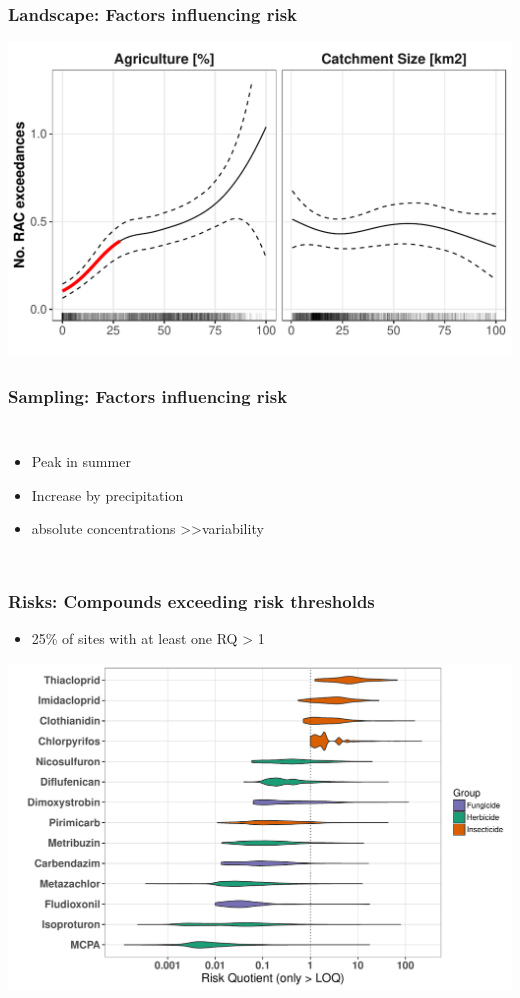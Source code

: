 \documentclass[
	12pt
	]{beamer}
\begin{document}
\begin{frame}
\frametitle{Landscape: Factors influencing risk}
	\includegraphics[width = 1\textwidth]{figs/agri_size_eff.pdf}
\end{frame}


\begin{frame}
\frametitle{Sampling: Factors influencing risk}
	\begin{columns}
			\resizebox{1.2\textwidth}{!}{%
				\begingroup
				\footnotesize %
					\hspace*{-10mm}
				\endgroup
				}

	    	\begin{itemize}
	    		\item Peak in summer
	    		\item Increase by \alert{precipitation}
	    		\item absolute concentrations \textgreater\textgreater variability
	    	\end{itemize}
	\end{columns}
\end{frame}



\begin{frame}
\frametitle{Risks: Compounds exceeding risk thresholds}
    \begin{itemize}
		\item 25\% of sites with at least one RQ > 1
	\end{itemize}
	\includegraphics[width = 1\textwidth]{figs/compounds.pdf}
\end{frame}
\end{document}
